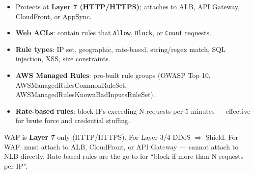 \begin{keyfacts}
\begin{itemize}
  \item Protects at \textbf{Layer 7 (HTTP/HTTPS)}; attaches to ALB, API Gateway, CloudFront,
        or AppSync.
  \item \textbf{Web ACLs}: contain rules that \texttt{Allow}, \texttt{Block}, or \texttt{Count} requests.
  \item \textbf{Rule types}: IP set, geographic, rate-based, string/regex match,
        SQL injection, XSS, size constraints.
  \item \textbf{AWS Managed Rules}: pre-built rule groups (OWASP Top 10, AWSManagedRulesCommonRuleSet,
        AWSManagedRulesKnownBadInputsRuleSet).
  \item \textbf{Rate-based rules}: block IPs exceeding N requests per 5 minutes
        --- effective for brute force and credential stuffing.
\end{itemize}
\end{keyfacts}

\begin{examtip}
WAF is \textbf{Layer 7} only (HTTP/HTTPS). For Layer 3/4 DDoS $\Rightarrow$ Shield.
For WAF: must attach to ALB, CloudFront, or API Gateway --- cannot attach to NLB directly.
Rate-based rules are the go-to for ``block if more than N requests per IP''.
\end{examtip}



